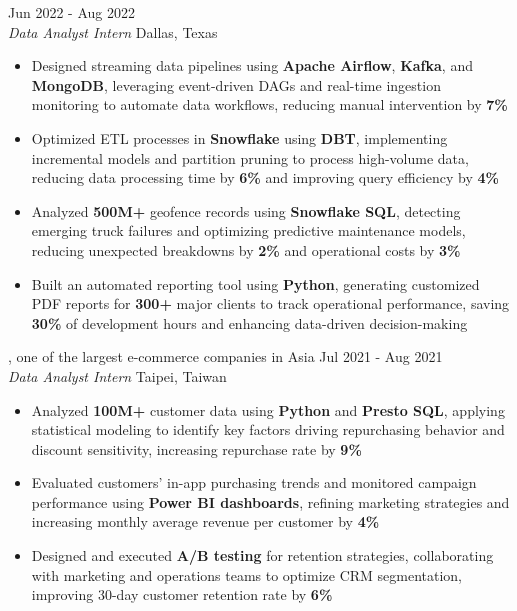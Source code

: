 \documentclass[11pt,letterpaper]{article}
\begin{document}
\vspace{4pt}
 \hfill Jun 2022 - Aug 2022\\[-1pt]
\textit{Data Analyst Intern} \hfill Dallas, Texas
\begin{itemize}[leftmargin=1.5em, rightmargin=0pt, itemsep=-1pt, topsep=-1pt, parsep=0pt]
  \item \justifying Designed streaming data pipelines using \textbf{Apache Airflow}, \textbf{Kafka}, and \textbf{MongoDB}, leveraging event-driven DAGs and real-time ingestion monitoring to automate data workflows, reducing manual intervention by \textbf{7\%}
  \item \justifying Optimized ETL processes in \textbf{Snowflake} using \textbf{DBT}, implementing incremental models and partition pruning to process high-volume data, reducing data processing time by \textbf{6\%} and improving query efficiency by \textbf{4\%}
  \item \justifying Analyzed \textbf{500M+} geofence records using \textbf{Snowflake SQL}, detecting emerging truck failures and optimizing predictive maintenance models, reducing unexpected breakdowns by \textbf{2\%} and operational costs by \textbf{3\%}
  \item \justifying Built an automated reporting tool using \textbf{Python}, generating customized PDF reports for \textbf{300+} major clients to track operational performance, saving \textbf{30\%} of development hours and enhancing data-driven decision-making
\end{itemize}

\vspace{4pt}
, one of the largest e-commerce companies in Asia \hfill Jul 2021 - Aug 2021\\[-1pt]
\textit{Data Analyst Intern} \hfill Taipei, Taiwan
\begin{itemize}[leftmargin=1.5em, rightmargin=0pt, itemsep=-1pt, topsep=-1pt, parsep=0pt]
  \item \justifying Analyzed \textbf{100M+} customer data using \textbf{Python} and \textbf{Presto SQL}, applying statistical modeling to identify key factors driving repurchasing behavior and discount sensitivity, increasing repurchase rate by \textbf{9\%}
  \item \justifying Evaluated customers' in-app purchasing trends and monitored campaign performance using \textbf{Power BI dashboards}, refining marketing strategies and increasing monthly average revenue per customer by \textbf{4\%}
  \item \justifying Designed and executed \textbf{A/B testing} for retention strategies, collaborating with marketing and operations teams to optimize CRM segmentation, improving 30-day customer retention rate by \textbf{6\%}
\end{itemize}
\end{document}
